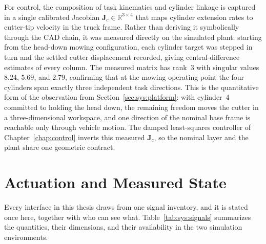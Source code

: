 For control, the composition of task kinematics and cylinder linkage is
captured in a single calibrated Jacobian
$\bm{J}_c \in \mathbb{R}^{3\times4}$ that maps cylinder extension rates
to cutter-tip velocity in the truck frame. Rather than deriving it
symbolically through the CAD chain, it was measured directly on the
simulated plant: starting from the head-down mowing configuration, each
cylinder target was stepped in turn and the settled cutter displacement
recorded, giving central-difference estimates of every column. The
measured matrix has rank~3 with singular values $8.24$, $5.69$, and
$2.79$, confirming that at the mowing operating point the four
cylinders span exactly three independent task directions. This is the
quantitative form of the observation from
Section~\ref{sec:sys:platform}: with cylinder~4 committed to holding
the head down, the remaining freedom moves the cutter in a
three-dimensional workspace, and one direction of the nominal base
frame is reachable only through vehicle motion. The damped
least-squares controller of Chapter~\ref{chap:control} inverts this measured $\bm{J}_c$, so the nominal layer and the plant share one
geometric contract.

\section{Actuation and Measured State}
\label{sec:sys:actuation}

Every interface in this thesis draws from one signal inventory, and it is stated once here, together with who can see what.
Table~\ref{tab:sys:signals} summarizes the quantities, their
dimensions, and their availability in the two simulation environments.

